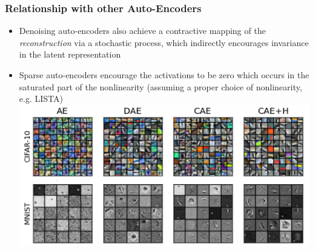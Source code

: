 \documentclass{beamer}
\begin{document}
\begin{frame}
\frametitle{Relationship with other Auto-Encoders}
\begin{itemize}
\item{Denoising auto-encoders also achieve a contractive mapping of the \emph{reconstruction} via a stochastic process, which indirectly encourages invariance in the latent representation}
\item{Sparse auto-encoders encourage the activations to be zero which occurs in the saturated part of the nonlinearity (assuming a proper choice of nonlinearity, e.g. LISTA)}
\includegraphics[scale = 0.2]{CAE2.png} 
\end{itemize} 
\end{frame}
\end{document}
